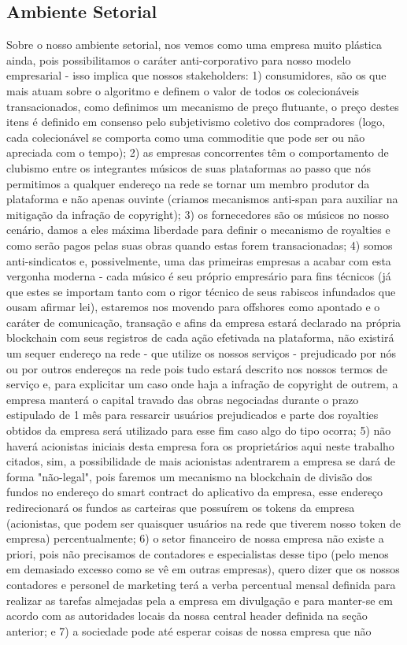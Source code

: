 \documentclass[onecolumn,12pt]{asme2ej}
\begin{document}
\subsection{Ambiente Setorial}

Sobre o nosso ambiente setorial, nos vemos como uma empresa muito plástica ainda, pois possibilitamos o caráter anti-corporativo para nosso modelo empresarial - isso implica que nossos stakeholders: 1) consumidores, são os que mais atuam sobre o algoritmo e definem o valor de todos os colecionáveis transacionados, como definimos um mecanismo de preço flutuante, o preço destes itens é definido em consenso pelo subjetivismo coletivo dos compradores (logo, cada colecionável se comporta como uma commoditie que pode ser ou não apreciada com o tempo); 2) as empresas concorrentes têm o comportamento de clubismo entre os integrantes músicos de suas plataformas ao passo que nós permitimos a qualquer endereço na rede se tornar um membro produtor da plataforma e não apenas ouvinte (criamos mecanismos anti-span para auxiliar na mitigação da infração de copyright); 3) os fornecedores são os músicos no nosso cenário, damos a eles máxima liberdade para definir o mecanismo de royalties e como serão pagos pelas suas obras quando estas forem transacionadas; 4) somos anti-sindicatos e, possivelmente, uma das primeiras empresas a acabar com esta vergonha moderna - cada músico é seu próprio empresário para fins técnicos (já que estes se importam tanto com o rigor técnico de seus rabiscos infundados que ousam afirmar lei), estaremos nos movendo para offshores como apontado e o caráter de comunicação, transação e afins da empresa estará declarado na própria blockchain com seus registros de cada ação efetivada na plataforma, não existirá um sequer endereço na rede - que utilize os nossos serviços - prejudicado por nós ou por outros endereços na rede pois tudo estará descrito nos nossos termos de serviço e, para explicitar um caso onde haja a infração de copyright de outrem, a empresa manterá o capital travado das obras negociadas durante o prazo estipulado de 1 mês para ressarcir usuários prejudicados e parte dos royalties obtidos da empresa será utilizado para esse fim caso algo do tipo ocorra; 5) não haverá acionistas iniciais desta empresa fora os proprietários aqui neste trabalho citados, sim, a possibilidade de mais acionistas adentrarem a empresa se dará de forma "não-legal", pois faremos um mecanismo na blockchain de divisão dos fundos no endereço do smart contract do aplicativo da empresa, esse endereço redirecionará os fundos as carteiras que possuírem os tokens da empresa (acionistas, que podem ser quaisquer usuários na rede que tiverem nosso token de empresa) percentualmente; 6) o setor financeiro de nossa empresa não existe a priori, pois não precisamos de contadores e especialistas desse tipo (pelo menos em demasiado excesso como se vê em outras empresas), quero dizer que os nossos contadores e personel de marketing terá a verba percentual mensal definida para realizar as tarefas almejadas pela a empresa em divulgação e para manter-se em acordo com as autoridades locais da nossa central header definida na seção anterior; e 7) a sociedade pode até esperar coisas de nossa empresa que não 
\end{document}
